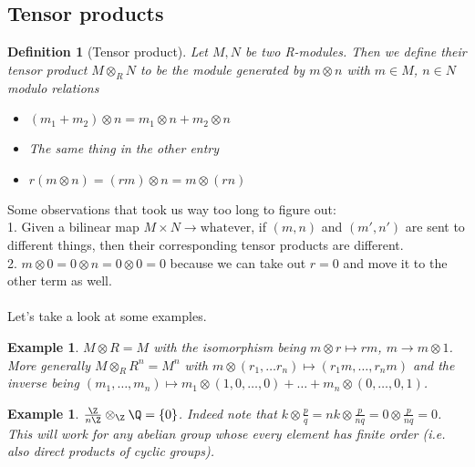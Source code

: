 \documentclass[a4paper]{article}
\newtheorem{exmp}[thm]{Example}
\newtheorem{defn}[thm]{Definition}
\begin{document}
\subsection*{Tensor products}
\begin{defn}[Tensor product]
    Let $M,N$ be two R-modules. Then we define their tensor product $M\otimes_RN$ to be the module generated by $m\otimes n$ with $m\in M$, $n \in N$ modulo relations
    \begin{itemize}
        \item $(m_1+m_2)\otimes n=m_1\otimes n + m_2\otimes n$
        \item The same thing in the other entry
        \item $r\left( m\otimes n \right) =\left( rm \right) \otimes n = m\otimes\left( rn \right) $
    \end{itemize}
\end{defn}
Some observations that took us way too long to figure out:\\
1. Given a bilinear map $M\times N\to \text{whatever}$, if $(m,n)$ and $(m', n')$ are sent to different things, then their corresponding tensor products are different.\\
2. $m \otimes 0=0\otimes n=0\otimes 0=0$ because we can take out $r=0$ and move it to the other term as well.\\
\\
Let's take a look at some examples.
\begin{exmp}
    $M\otimes R = M$ with the isomorphism being $m\otimes r\mapsto rm$, $m\to m\otimes 1$. More generally $M\otimes_R R^{n}=M^{n}$ with $m\otimes \left( r_1, \ldots r_n \right)\mapsto \left( r_1 m, \ldots, r_n m \right) $ and the inverse being $\left( m_1, \ldots, m_n \right)\mapsto m_1\otimes \left( 1,0, \ldots, 0 \right) +\ldots +m_n\otimes \left( 0, \ldots, 0,1 \right)  $. 
\end{exmp}
\begin{exmp}
    $\frac{\Z}{n\Z}\otimes_\Z \Q=\left\{ 0 \right\} $. Indeed note that $k\otimes \frac{p}{q}=nk\otimes \frac{p}{nq}=0\otimes \frac{p}{nq}=0$. This will work for any abelian group whose every element has finite order (i.e. also direct products of cyclic groups).
\end{exmp}
\end{document}
